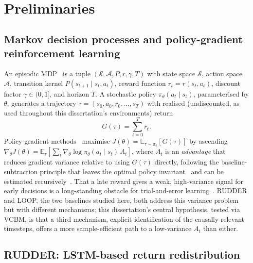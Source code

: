 
\section{Preliminaries}
\label{sec:preliminaries}

\subsection{Markov decision processes and policy-gradient reinforcement learning}
\label{sec:prelim-mdp}

An episodic MDP~\cite{sutton2018rlbook} is a tuple $(\mathcal{S}, \mathcal{A}, P, r, \gamma, T)$ with state space $\mathcal{S}$, action space $\mathcal{A}$, transition kernel $P(s_{t+1} \mid s_t, a_t)$, reward function $r_t = r(s_t, a_t)$, discount factor $\gamma \in (0,1]$, and horizon $T$. A stochastic policy $\pi_\theta(a_t \mid s_t)$, parameterised by $\theta$, generates a trajectory $\tau = (s_0, a_0, r_0, \dots, s_T)$ with realised (undiscounted, as used throughout this dissertation's environments) return
\begin{equation}
  G(\tau) = \sum_{t=0}^{T} r_t .
  \label{eq:return}
\end{equation}
Policy-gradient methods~\cite{sutton1999policygradient} maximise $J(\theta) = \mathbb{E}_{\tau \sim \pi_\theta}[G(\tau)]$ by ascending $\nabla_\theta J(\theta) = \mathbb{E}_{\tau}\!\left[\sum_t \nabla_\theta \log \pi_\theta(a_t \mid s_t)\, A_t\right]$, where $A_t$ is an \emph{advantage} that reduces gradient variance relative to using $G(\tau)$ directly, following the baseline-subtraction principle that leaves the optimal policy invariant~\cite{ng1999shaping} and can be estimated recursively~\cite{schulman2016gae}. That a late reward gives a weak, high-variance signal for early decisions is a long-standing obstacle for trial-and-error learning~\cite{minsky1961steps}. RUDDER and LOOP, the two baselines studied here, both address this variance problem but with different mechanisms; this dissertation's central hypothesis, tested via VCBM, is that a third mechanism, explicit identification of the causally relevant timesteps, offers a more sample-efficient path to a low-variance $A_t$ than either.

\subsection{RUDDER: LSTM-based return redistribution}
\label{sec:prelim-rudder}

